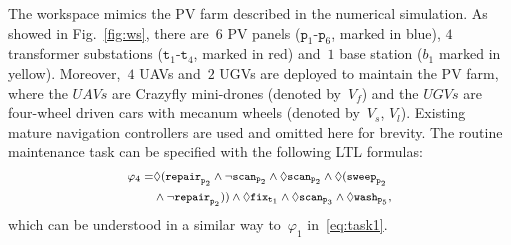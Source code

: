 The workspace mimics the PV farm described in the numerical simulation.
As showed in Fig.~\ref{fig:ws},
there are~$6$ PV panels ($\texttt{p}_1$-$\texttt{p}_6$, marked in blue),
$4$ transformer substations
($\texttt{t}_1$-$\texttt{t}_4$, marked in red)
and~$1$ base station ($b_1$ marked in yellow).
Moreover,~$4$ UAVs and~$2$ UGVs are deployed to maintain the PV farm,
where the $UAVs$ are Crazyfly mini-drones (denoted by~$V_f$) and
the $UGVs$ are four-wheel driven cars with mecanum wheels (denoted by~$V_s$, $V_l$).
Existing mature navigation controllers are used and omitted here for brevity.
The routine maintenance task can be specified with the following LTL formulas:
\begin{equation}\footnotesize
\begin{aligned}
	\varphi_4=& \Diamond(\texttt{repair}_{\texttt{p}_2} \land  \lnot\texttt{scan}_{\texttt{p}_2} \land \Diamond
	\texttt{scan}_{\texttt{p}_2}
	\land \Diamond (\texttt{sweep}_{\texttt{p}_2} \\
	& \land \lnot \texttt{repair}_{\texttt{p}_2}) )\land \Diamond \texttt{fix}_{\texttt{t}_1} \land \Diamond \texttt{scan}_{\texttt{p}_3}
	\land \Diamond \texttt{wash}_{\texttt{p}_5},
\end{aligned}
\end{equation}
which can be understood in a similar way to~$\varphi_1$ in~\eqref{eq:task1}.


